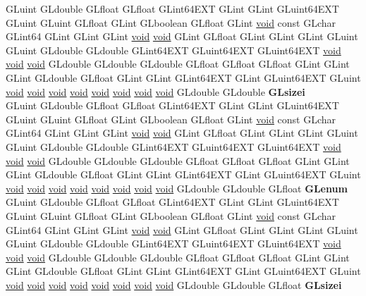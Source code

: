 \begin{DoxyCompactItemize}
\begin{tabbing}
\>GLuint GLdouble GLfloat GLfloat GLint64EXT GLint GLint GLuint64EXT GLuint GLuint GLfloat GLint GLboolean GLfloat GLint \hyperlink{interfacevoid}{void} const GLchar GLint64 GLint GLint GLint \hyperlink{interfacevoid}{void} \hyperlink{interfacevoid}{void} GLint GLfloat GLint GLint GLint GLuint GLuint GLdouble GLdouble GLint64EXT GLuint64EXT GLuint64EXT \hyperlink{interfacevoid}{void} \hyperlink{interfacevoid}{void} \hyperlink{interfacevoid}{void} GLdouble GLdouble GLdouble GLfloat GLfloat GLfloat GLint GLint GLint GLdouble GLfloat GLint GLint GLint64EXT GLint GLuint64EXT GLuint \hyperlink{interfacevoid}{void} \hyperlink{interfacevoid}{void} \hyperlink{interfacevoid}{void} \hyperlink{interfacevoid}{void} \hyperlink{interfacevoid}{void} \hyperlink{interfacevoid}{void} \hyperlink{interfacevoid}{void} \hyperlink{interfacevoid}{void} GLdouble GLdouble {\bfseries GLsizei}\\
\>GLuint GLdouble GLfloat GLfloat GLint64EXT GLint GLint GLuint64EXT GLuint GLuint GLfloat GLint GLboolean GLfloat GLint \hyperlink{interfacevoid}{void} const GLchar GLint64 GLint GLint GLint \hyperlink{interfacevoid}{void} \hyperlink{interfacevoid}{void} GLint GLfloat GLint GLint GLint GLuint GLuint GLdouble GLdouble GLint64EXT GLuint64EXT GLuint64EXT \hyperlink{interfacevoid}{void} \hyperlink{interfacevoid}{void} \hyperlink{interfacevoid}{void} GLdouble GLdouble GLdouble GLfloat GLfloat GLfloat GLint GLint GLint GLdouble GLfloat GLint GLint GLint64EXT GLint GLuint64EXT GLuint \hyperlink{interfacevoid}{void} \hyperlink{interfacevoid}{void} \hyperlink{interfacevoid}{void} \hyperlink{interfacevoid}{void} \hyperlink{interfacevoid}{void} \hyperlink{interfacevoid}{void} \hyperlink{interfacevoid}{void} \hyperlink{interfacevoid}{void} GLdouble GLdouble GLfloat {\bfseries GLenum}\\
\>GLuint GLdouble GLfloat GLfloat GLint64EXT GLint GLint GLuint64EXT GLuint GLuint GLfloat GLint GLboolean GLfloat GLint \hyperlink{interfacevoid}{void} const GLchar GLint64 GLint GLint GLint \hyperlink{interfacevoid}{void} \hyperlink{interfacevoid}{void} GLint GLfloat GLint GLint GLint GLuint GLuint GLdouble GLdouble GLint64EXT GLuint64EXT GLuint64EXT \hyperlink{interfacevoid}{void} \hyperlink{interfacevoid}{void} \hyperlink{interfacevoid}{void} GLdouble GLdouble GLdouble GLfloat GLfloat GLfloat GLint GLint GLint GLdouble GLfloat GLint GLint GLint64EXT GLint GLuint64EXT GLuint \hyperlink{interfacevoid}{void} \hyperlink{interfacevoid}{void} \hyperlink{interfacevoid}{void} \hyperlink{interfacevoid}{void} \hyperlink{interfacevoid}{void} \hyperlink{interfacevoid}{void} \hyperlink{interfacevoid}{void} \hyperlink{interfacevoid}{void} GLdouble GLdouble GLfloat {\bfseries GLsizei}\\

\end{tabbing}
\end{DoxyCompactItemize}

